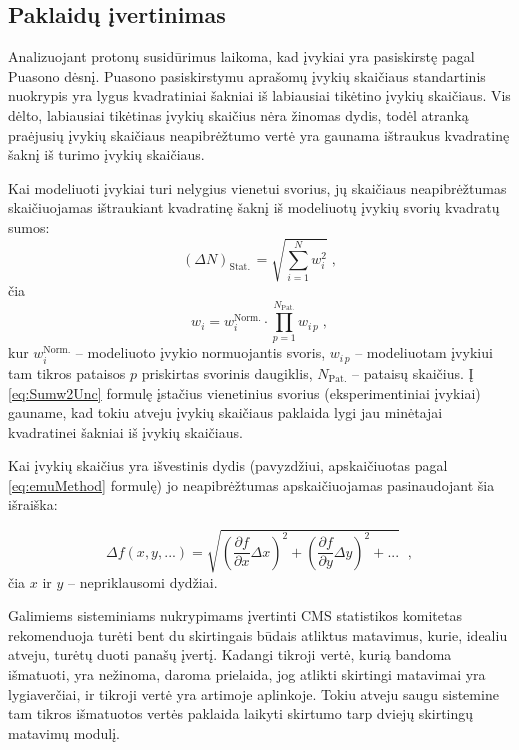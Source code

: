 \documentclass[a4paper, 12pt, oneside]{article}
\newlength\q
\begin{document}
\subsection{Paklaidų įvertinimas}\label{sec:uncertainties}

Analizuojant protonų susidūrimus laikoma, kad įvykiai yra pasiskirstę pagal Puasono dėsnį.
Puasono pasiskirstymu aprašomų įvykių skaičiaus standartinis nuokrypis yra lygus kvadratiniai šakniai iš labiausiai
tikėtino įvykių skaičiaus.
Vis dėlto, labiausiai tikėtinas įvykių skaičius nėra žinomas dydis, todėl atranką praėjusių įvykių skaičiaus neapibrėžtumo
vertė yra gaunama ištraukus kvadratinę šaknį iš turimo įvykių skaičiaus.

Kai modeliuoti įvykiai turi nelygius vienetui svorius, jų skaičiaus neapibrėžtumas skaičiuojamas ištraukiant
kvadratinę šaknį iš modeliuotų įvykių svorių kvadratų sumos:
\begin{equation}
	(\Delta N)_{\mathrm{Stat.\,}} = \sqrt{\sum_{i=1}^{N}w_{i}^{2}} \; ,
	\label{eq:Sumw2Unc}
\end{equation}
čia $$w_{i}=w_{i}^{\mathrm{Norm.}} \cdot \prod_{p=1}^{N_{\mathrm{Pat.}}}w_{i \, p} \; ,$$
kur $w_{i}^{\mathrm{Norm.}}$ -- modeliuoto įvykio normuojantis svoris, $w_{i \, p}$ -- modeliuotam įvykiui tam tikros pataisos $p$ priskirtas
svorinis daugiklis, $N_{\mathrm{Pat.}}$ -- pataisų skaičius.
Į \eqref{eq:Sumw2Unc} formulę įstačius vienetinius svorius (eksperimentiniai įvykiai) gauname, kad tokiu atveju įvykių
skaičiaus paklaida lygi jau minėtajai kvadratinei šakniai iš įvykių skaičiaus.

Kai įvykių skaičius yra išvestinis dydis (pavyzdžiui,  apskaičiuotas pagal \eqref{eq:emuMethod} formulę) jo neapibrėžtumas
 apskaičiuojamas pasinaudojant šia išraiška:

\begin{equation}
	\Delta f(x, y, ...) =
	\sqrt{ \left( \frac{\partial f}{\partial x} \Delta x \right)^{2} +
	\left( \frac{\partial f}{\partial y} \Delta y \right)^{2} + ... } \;\; \mathrm{,}
	\label{eq:DerUnc}
\end{equation}
čia $x$ ir $y$ -- nepriklausomi dydžiai.

Galimiems sisteminiams nukrypimams įvertinti CMS statistikos komitetas rekomenduoja turėti bent du skirtingais būdais
atliktus matavimus, kurie, idealiu atveju, turėtų duoti panašų įvertį.
Kadangi tikroji vertė, kurią bandoma išmatuoti, yra nežinoma, daroma prielaida, jog atlikti skirtingi matavimai yra
lygiaverčiai, ir tikroji vertė yra artimoje aplinkoje.
Tokiu atveju saugu sistemine tam tikros išmatuotos vertės paklaida laikyti skirtumo tarp dviejų skirtingų matavimų
modulį.
\end{document}

